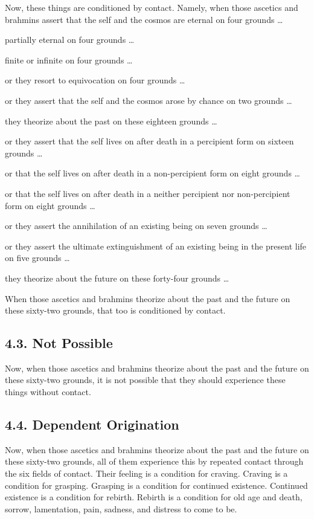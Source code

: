 \documentclass[12pt,openany]{book}%
\begin{document}
Now, these things are conditioned by contact. Namely, when those ascetics and brahmins assert that the self and the cosmos are eternal on four grounds … 

partially eternal on four grounds … 

finite or infinite on four grounds … 

or they resort to equivocation on four grounds … 

or they assert that the self and the cosmos arose by chance on two grounds … 

they theorize about the past on these eighteen grounds … 

or they assert that the self lives on after death in a percipient form on sixteen grounds … 

or that the self lives on after death in a non-percipient form on eight grounds … 

or that the self lives on after death in a neither percipient nor non-percipient form on eight grounds … 

or they assert the annihilation of an existing being on seven grounds … 

or they assert the ultimate extinguishment of an existing being in the present life on five grounds … 

they theorize about the future on these forty-four grounds … 

When those ascetics and brahmins theorize about the past and the future on these sixty-two grounds, that too is conditioned by contact. 

\subsection*{4.3. Not Possible }

Now, when those ascetics and brahmins theorize about the past and the future on these sixty-two grounds, it is not possible that they should experience these things without contact. 

\subsection*{4.4. Dependent Origination }

Now, when those ascetics and brahmins theorize about the past and the future on these sixty-two grounds, all of them experience this by repeated contact through the six fields of contact. Their feeling is a condition for craving. Craving is a condition for grasping. Grasping is a condition for continued existence. Continued existence is a condition for rebirth. Rebirth is a condition for old age and death, sorrow, lamentation, pain, sadness, and distress to come to be. 
\end{document}
